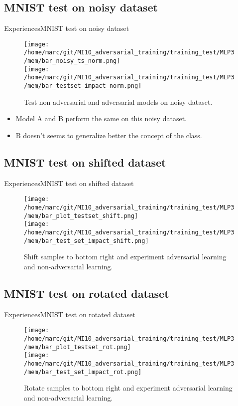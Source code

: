 \documentclass[10pt]{beamer}
\begin{document}
\subsection{MNIST test on noisy dataset}
\begin{frame}{Experiences}{MNIST test on noisy dataset}
  \begin{figure}
    \centering
    \texttt{[image: /home/marc/git/MI10\_adversarial\_training/training\_test/MLP3/mem/bar\_noisy\_ts\_norm.png]}\\
    \pause
    \texttt{[image: /home/marc/git/MI10\_adversarial\_training/training\_test/MLP3/mem/bar\_testset\_impact\_norm.png]}
    \caption{Test non-adversarial and adversarial models on noisy dataset.}
    \label{fig:mnist_noisy_result}
  \end{figure}
  \pause
  \begin{itemize}
    \item Model A and B perform the same on this noisy dataset.
    \item B doesn't seems to generalize better the concept of the class.
  \end{itemize}
\end{frame}


\subsection{MNIST test on shifted dataset}
\begin{frame}{Experiences}{MNIST test on shifted dataset}
  \begin{figure}
    \centering
    \texttt{[image: /home/marc/git/MI10\_adversarial\_training/training\_test/MLP3/mem/bar\_plot\_testset\_shift.png]}\\
    \pause
    \texttt{[image: /home/marc/git/MI10\_adversarial\_training/training\_test/MLP3/mem/bar\_test\_set\_impact\_shift.png]}
    \caption{Shift samples to bottom right and experiment adversarial learning and non-adversarial learning.}
    \label{fig:mnist_adv_shift_ds_img}
  \end{figure}
  \pause
\end{frame}

\subsection{MNIST test on rotated dataset}
\begin{frame}{Experiences}{MNIST test on rotated dataset}
  \begin{figure}
    \centering
    \texttt{[image: /home/marc/git/MI10\_adversarial\_training/training\_test/MLP3/mem/bar\_plot\_testset\_rot.png]}\\
    \pause
    \texttt{[image: /home/marc/git/MI10\_adversarial\_training/training\_test/MLP3/mem/bar\_test\_set\_impact\_rot.png]}
    \caption{Rotate samples to bottom right and experiment adversarial learning and non-adversarial learning.}
    \label{fig:mnist_adv_rot_ds_img}
  \end{figure}
\end{frame}
\end{document}
